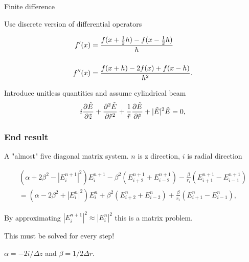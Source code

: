 \begin{frame}{Finite difference}

Use discrete version of differential operators

\begin{align*}
  f'(x) &= \frac{f(x+\frac{1}{2} h) - f(x - \frac{1}{2} h)}{h}\\[5mm]
  f''(x) &= \frac{f(x+h) - 2f(x) + f(x-h)}{h^{2}}.
\end{align*}

Introduce unitless quantities and assume cylindrical beam
\[   i \frac{\partial \tilde E}{\partial \tilde z} + \frac{\partial^2 \tilde E}{\partial \tilde r^2}
+ \frac{1}{\tilde r} \frac{\partial \tilde E}{\partial \tilde r}
+ |\tilde E|^2 \tilde E
= 0,\]
  
\end{frame}

\begin{frame}
  \frametitle{End result}
  A "almost" five diagonal matrix system.
  $n$ is z direction, $i$ is radial direction
  
  \begin{align*}
    (\alpha + 2\beta^{2} - |E_{i}^{n+1}|^{2})E_{i}^{n+1} - \beta^{2}(E_{i+2}^{n+1} + E_{i-2}^{n+1}) -
    \frac{\beta}{r_{i}} (E_{i+1}^{n+1} - E_{i-1}^{n+1}) \\
    = (\alpha - 2\beta^{2} + |E_{i}^{n}|^{2})E_{i}^{n} + \beta^{2}(E_{i+2}^{n} + E_{i-2}^{n}) +
    \frac{\beta}{r_{i}} (E_{i+1}^{n} - E_{i-1}^{n}),
  \end{align*}


  By approximating $|E_{i}^{n+1}|^{2} \approx |E_{i}^{n}|^{2}$ this is a matrix problem.

  This must be solved for every step!


  \vfill
  $\alpha = -2i/\!{\Delta z}$ and $\beta = 1/{2 \Delta r}$.

\end{frame}

